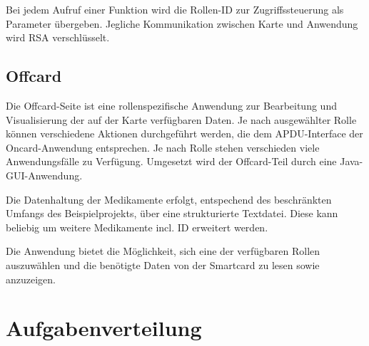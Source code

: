 \documentclass[parskip]{scrartcl}
\begin{document}
			Bei jedem Aufruf einer Funktion wird die Rollen-ID zur Zugriffssteuerung als Parameter übergeben. Jegliche Kommunikation zwischen Karte und Anwendung wird RSA verschlüsselt.
		
		\subsection{Offcard}
			Die Offcard-Seite ist eine rollenspezifische Anwendung zur Bearbeitung und Visualisierung der auf der Karte verfügbaren Daten. Je nach ausgewählter Rolle können verschiedene Aktionen durchgeführt werden, die dem APDU-Interface der Oncard-Anwendung entsprechen. Je nach Rolle stehen verschieden viele Anwendungsfälle zu Verfügung. Umgesetzt wird der Offcard-Teil durch eine Java-GUI-Anwendung. 
			
			Die Datenhaltung der Medikamente erfolgt, entspechend des beschränkten Umfangs des Beispielprojekts, über eine strukturierte Textdatei. Diese kann beliebig um weitere Medikamente incl. ID erweitert werden.
			
			Die Anwendung bietet die Möglichkeit, sich eine der verfügbaren Rollen auszuwählen und die benötigte Daten von der Smartcard zu lesen sowie anzuzeigen.
		
	\section{Aufgabenverteilung}
	
\end{document}
